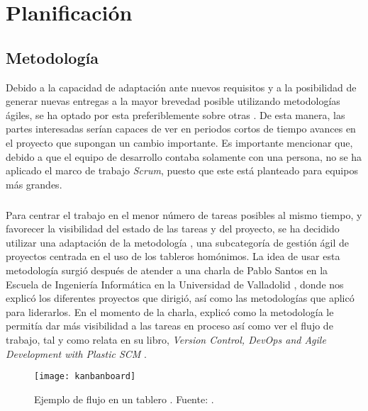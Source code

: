 \documentclass{subfiles}
\begin{document}
    \chapter{Planificación}
    \label{chap:planificacion}

        \section{Metodología}
        \label{sec:metodologia}
        
        {Debido a la capacidad de adaptación ante nuevos requisitos y a la posibilidad de generar nuevas entregas a la mayor brevedad posible utilizando metodologías ágiles, se ha optado por esta preferiblemente sobre otras \cite{agilewebsite}. De esta manera, las partes interesadas serían capaces de ver en periodos cortos de tiempo avances en el proyecto que supongan un cambio importante. Es importante mencionar que, debido a que el equipo de desarrollo contaba solamente con una persona, no se ha aplicado el marco de trabajo \textit{Scrum}, puesto que este está planteado para equipos más grandes.}
        
        \paragraph{}
        {Para centrar el trabajo en el menor número de tareas posibles al mismo tiempo, y favorecer la visibilidad del estado de las tareas y del proyecto, se ha decidido utilizar una adaptación de la metodología \Kanban\cite{web:kanban}, una subcategoría de gestión ágil de proyectos centrada en el uso de los tableros homónimos. La idea de usar esta metodología surgió después de atender a una charla de Pablo Santos en la Escuela de Ingeniería Informática en la Universidad de Valladolid \cite{web:pablosantos}, donde nos explicó los diferentes proyectos que dirigió, así como las metodologías que aplicó para liderarlos. En el momento de la charla, explicó como la metodología \Kanban le permitía dar más visibilidad a las tareas en proceso así como ver el flujo de trabajo, tal y como relata en su libro, \textit{Version Control, DevOps and Agile Development with Plastic SCM} \cite{book:santos_pablo_versioncontrol}.}

        \begin{figure}
        \centering
        \texttt{[image: kanbanboard]}
        \caption{Ejemplo de flujo en un tablero \Kanban. Fuente: .}
        \label{fig:kanbanboard}
        \end{figure}
\end{document}
